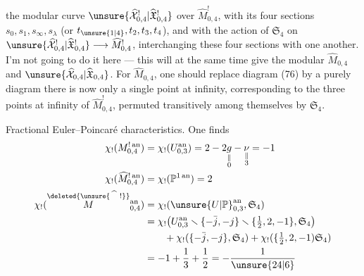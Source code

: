 the modular curve $\unsure{\widehat{\mathcal X}^!_{0,4}|\widehat{\mathfrak X}^!_{0,4}}$ over $\widehat M^!_{0,4}$, with its four sections $s_0,s_1,s_\infty,s_\lambda$ (or $t_{\unsure{1|4}},t_2,t_3,t_4$), and with the action of $\mathfrak S_4$  on $\unsure{\widehat{\mathcal X}^!_{0,4}|\widehat{\mathfrak X}^!_{0,4}}\longrightarrow\widehat M^!_{0,4}$, interchanging these four sections with one another. I'm not going to do it here --- this will at the same time give the modular  $\widehat M_{0,4}$ and $\unsure{\widehat{\mathcal X}_{0,4}|\widehat{\mathfrak X}_{0,4}}$. For $\widehat M_{0,4}$, one should replace diagram (76) by a purely  diagram
there is now only a single point at infinity, corresponding to the three points at infinity of $\widehat M^!_{0,4}$, permuted transitively among themselves by $\mathfrak S_4$.

Fractional Euler–Poincaré characteristics. One finds
\[
\begin{aligned}
\chi_!(M^{!\,\mathrm{an}}_{0,4})&=\chi_!(U^{\mathrm{an}}_{0,3})=2-2\underset{\substack{\Vert\\0}}{g}-\underset{\substack{\Vert\\3}}{\nu}=-1\\
\chi_!(\widehat M^{!\,\mathrm{an}}_{0,4})&=\chi_!(\mathbb P^{1\,\mathrm{an}})=2\\
\chi_!(\overset{\deleted{\unsure{\widehat{\phantom M}\,!}}}{M}{}^{\mathrm{an}}_{0,4})&=\chi_!(\unsure{U|\mathbb P}^{\mathrm{an}}_{0,3},\mathfrak S_4)\\
&=\chi_!\bigl(U^{\mathrm{an}}_{0,3}\smallsetminus\{-\bar j,-j\}\smallsetminus\{\tfrac12,2,-1\},\mathfrak S_4\bigr)\\
&\qquad+\chi_!(\{-\bar j,-j\},\mathfrak S_4)+\chi_!(\{\tfrac12,2,-1)\mathfrak S_4)\\
&=-1+\frac13+\frac12=-\frac1{\unsure{24|6}}
\end{aligned}
\]
